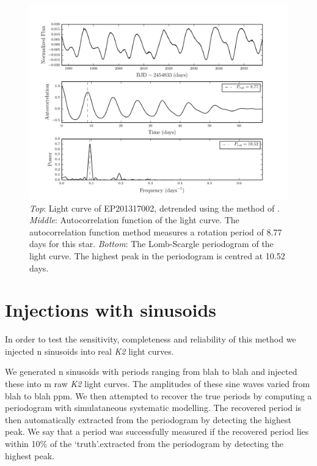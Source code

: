 \documentclass[useAMS, usenatbib]{aastex}
\begin{document}
\begin{figure}
\begin{center}
\includegraphics[width=6in, clip=true]{rotation_poster_child.pdf}
\caption{{\it Top}: Light curve of EP201317002, detrended using the method
of \citet{Vanderburg2014}. {\it Middle}: Autocorrelation function of the
light curve. The autocorrelation function method measures a rotation period of
8.77 days for this star. {\it Bottom}: The Lomb-Scargle periodogram of the
light curve. The highest peak in the periodogram is centred at 10.52 days.}
\label{fig:rotation_poster_child}
\end{center}
\end{figure}

\section{Injections with sinusoids}

In order to test the sensitivity, completeness and reliability of this method
we injected n sinusoids into real {\it K2} light curves.

We generated n sinusoids with periods ranging from blah to blah and injected
these into m raw {\it K2} light curves.
The amplitudes of these sine waves varied from blah to blah ppm.
We then attempted to recover the true periods by computing a periodogram with
simulataneous systematic modelling.
The recovered period is then automatically extracted from the periodogram by
detecting the highest peak.
We say that a period was successfully measured if the recovered period lies
within 10\% of the `truth'.extracted from the periodogram by
detecting the highest peak.



\end{document}
